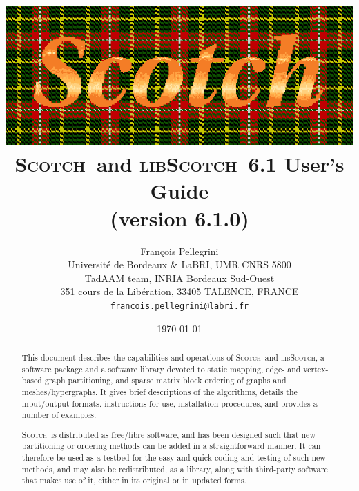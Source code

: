 \documentclass{article}
\newcommand{\scotch}{\textsc{Scotch}}               %
\newcommand{\libscotch}{\textsc{libScotch}}         %
\newcommand{\scotchver}{6.1}
\newcommand{\scotchversub}{6.1.0}
\begin{document}
\date{\today}

\title{\includegraphics{../misc/scotch_logo_color.ps}\\[1em]
       {\LARGE\bf \scotch\ and \libscotch\ \textsc{\scotchver} User's Guide}\\[1em]%
       {\normalsize (version \scotchversub)}
}

\author{Fran\c cois Pellegrini\\
Universit\'e de Bordeaux \& LaBRI, UMR CNRS 5800\\
TadAAM team, INRIA Bordeaux Sud-Ouest\\
351 cours de la Lib\'eration, 33405 TALENCE, FRANCE\\
{\tt francois.pellegrini@labri.fr}}

\maketitle

\begin{abstract}
This document describes the capabilities and operations of
\scotch\ and \libscotch, a software package and a software library
devoted to static mapping, edge- and vertex-based graph partitioning,
and sparse matrix block ordering of graphs and meshes/hypergraphs. It
gives brief descriptions of the algorithms, details the input/output
formats, instructions for use, installation procedures, and provides a
number of examples.

\scotch\ is distributed as free/libre software, and has been
designed such that new partitioning or ordering methods can be added
in a straightforward manner. It can therefore be used as a testbed for
the easy and quick coding and testing of such new methods, and may
also be redistributed, as a library, along with third-party software
that makes use of it, either in its original or in updated forms.
\end{abstract}
\end{document}
